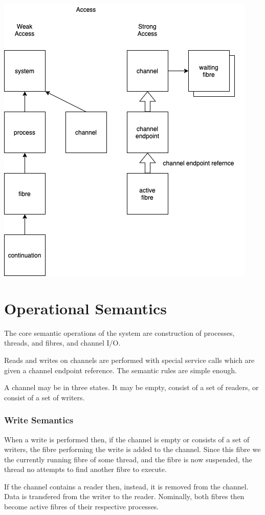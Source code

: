 \documentclass[oneside]{book}
\begin{document}
\includegraphics{../src/tex/weak_access.png}

\chapter{Operational Semantics}
The core semantic operations of the system are construction of
processes, threads, and fibres, and channel I/O.

Reads and writes on channels are performed with special service calls
which are given a channel endpoint reference. The semantic rules
are simple enough.

A channel may be in three states. It may be empty, consist of a set
of readers, or consist of a set of writers.

\subsection{Write Semantics}
When a write is performed then, if the channel is empty or consists 
of a set of writers, the fibre performing the write is added to the channel.
Since this fibre we the currently running fibre of some thread, and the
fibre is now suspended, the thread no attempts to find another 
fibre to execute.

If the channel contains a reader then, instead, it is removed from
the channel. Data is transfered from the writer to the reader.
Nominally, both fibres then become active fibres of their 
respective processes.
\end{document}

